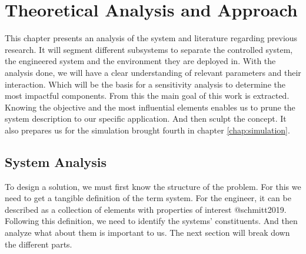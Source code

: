 \chapter{Theoretical Analysis and Approach}
\label{chap:analysis-and-arch}
This chapter presents an analysis of the system and literature regarding previous research.
It will segment different subsystems to separate the controlled system, the engineered system and the environment they are deployed in.
With the analysis done, we will have a clear understanding of relevant parameters and their interaction.
Which will be the basis for a sensitivity analysis to determine the most impactful components.
From this the main goal of this work is extracted.
Knowing the objective and the most influential elements enables us to prune the system description to our specific application.
And then sculpt the concept.
It also prepares us for the simulation brought fourth in chapter \ref{chap:simulation}.



%
\section{System Analysis}
\label{sec:system-analysis}
To design a solution, we must first know the structure of the problem. %
For this we need to get a tangible definition of the term system.
For the engineer, it can be described as a collection of elements with properties of interest @schmitt2019.
Following this definition, we need to identify the systems' constituents.
And then analyze what about them is important to us.
The next section will break down the different parts.

